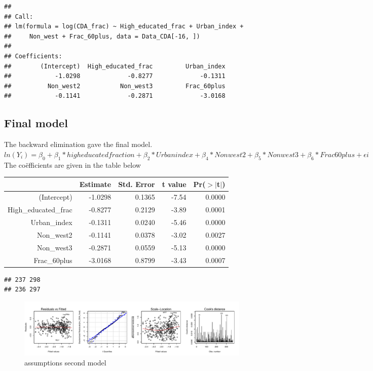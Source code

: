 \documentclass[11pt,]{article}
\begin{document}
\begin{verbatim}
## 
## Call:
## lm(formula = log(CDA_frac) ~ High_educated_frac + Urban_index + 
##     Non_west + Frac_60plus, data = Data_CDA[-16, ])
## 
## Coefficients:
##        (Intercept)  High_educated_frac         Urban_index  
##            -1.0298             -0.8277             -0.1311  
##          Non_west2           Non_west3         Frac_60plus  
##            -0.1141             -0.2871             -3.0168
\end{verbatim}

\subsection{Final model}\label{final-model}

The backward elimination gave the final model.\\
\(ln(Y_i) = \beta_0 + \beta_1*high educated fraction + \beta_2*Urban index + \beta_4*Non west2 + \beta_5*Non west 3 + \beta_6*Frac 60plus + \epsilon i\)
The coëfficients are given in the table below

\begin{table}[ht]
\centering
\begin{tabular}{rrrrr}
  \hline
 & Estimate & Std. Error & t value & Pr($>$$|$t$|$) \\ 
  \hline
(Intercept) & -1.0298 & 0.1365 & -7.54 & 0.0000 \\ 
  High\_educated\_frac & -0.8277 & 0.2129 & -3.89 & 0.0001 \\ 
  Urban\_index & -0.1311 & 0.0240 & -5.46 & 0.0000 \\ 
  Non\_west2 & -0.1141 & 0.0378 & -3.02 & 0.0027 \\ 
  Non\_west3 & -0.2871 & 0.0559 & -5.13 & 0.0000 \\ 
  Frac\_60plus & -3.0168 & 0.8799 & -3.43 & 0.0007 \\ 
   \hline
\end{tabular}
\end{table}

\begin{verbatim}
## 237 298 
## 236 297
\end{verbatim}

\begin{figure}[H]

{\centering \includegraphics{lm_part_report_files/figure-latex/unnamed-chunk-5-1} 

}

\caption{\label{asm}assumptions second model}\label{fig:unnamed-chunk-5}
\end{figure}
\end{document}
